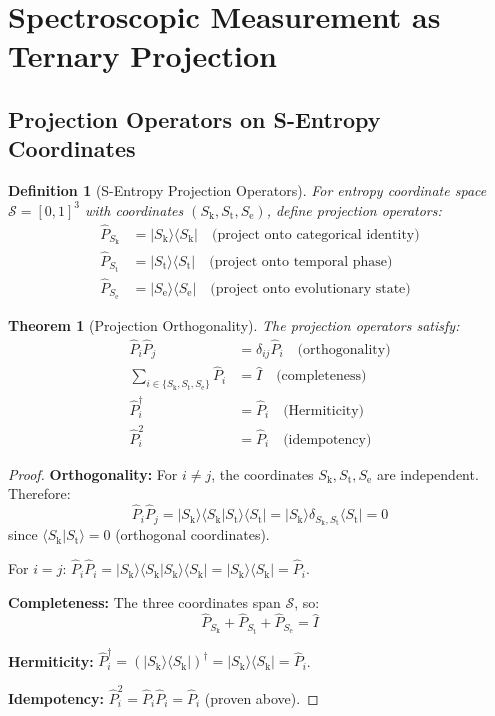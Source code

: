 \documentclass[twocolumn,10pt]{article}
\newtheorem{theorem}{Theorem}[section]
\newtheorem{definition}{Definition}[section]
\newcommand{\Sk}{S_{\text{k}}}
\newcommand{\St}{S_{\text{t}}}
\newcommand{\Se}{S_{\text{e}}}
\newcommand{\Sspace}{\mathcal{S}}
\begin{document}
\section{Spectroscopic Measurement as Ternary Projection}

\subsection{Projection Operators on S-Entropy Coordinates}

\begin{definition}[S-Entropy Projection Operators]
For entropy coordinate space $\Sspace = [0,1]^3$ with coordinates $(\Sk, \St, \Se)$, define projection operators:
\begin{align}
\hat{P}_{\Sk} &= |\Sk\rangle\langle\Sk| \quad \text{(project onto categorical identity)} \\
\hat{P}_{\St} &= |\St\rangle\langle\St| \quad \text{(project onto temporal phase)} \\
\hat{P}_{\Se} &= |\Se\rangle\langle\Se| \quad \text{(project onto evolutionary state)}
\end{align}
\end{definition}

\begin{theorem}[Projection Orthogonality]
\label{thm:projection_orthogonality}
The projection operators satisfy:
\begin{align}
\hat{P}_i \hat{P}_j &= \delta_{ij} \hat{P}_i \quad \text{(orthogonality)} \\
\sum_{i \in \{\Sk,\St,\Se\}} \hat{P}_i &= \hat{I} \quad \text{(completeness)} \\
\hat{P}_i^\dagger &= \hat{P}_i \quad \text{(Hermiticity)} \\
\hat{P}_i^2 &= \hat{P}_i \quad \text{(idempotency)}
\end{align}
\end{theorem}

\begin{proof}
\textbf{Orthogonality:} For $i \neq j$, the coordinates $\Sk, \St, \Se$ are independent. Therefore:
\begin{equation}
\hat{P}_i \hat{P}_j = |\Sk\rangle\langle\Sk|\St\rangle\langle\St| = |\Sk\rangle \delta_{\Sk,\St} \langle\St| = 0
\end{equation}
since $\langle\Sk|\St\rangle = 0$ (orthogonal coordinates).

For $i = j$: $\hat{P}_i \hat{P}_i = |\Sk\rangle\langle\Sk|\Sk\rangle\langle\Sk| = |\Sk\rangle\langle\Sk| = \hat{P}_i$.

\textbf{Completeness:} The three coordinates span $\Sspace$, so:
\begin{equation}
\hat{P}_{\Sk} + \hat{P}_{\St} + \hat{P}_{\Se} = \hat{I}
\end{equation}

\textbf{Hermiticity:} $\hat{P}_i^\dagger = (|\Sk\rangle\langle\Sk|)^\dagger = |\Sk\rangle\langle\Sk| = \hat{P}_i$.

\textbf{Idempotency:} $\hat{P}_i^2 = \hat{P}_i \hat{P}_i = \hat{P}_i$ (proven above).
\end{proof}
\end{document}
